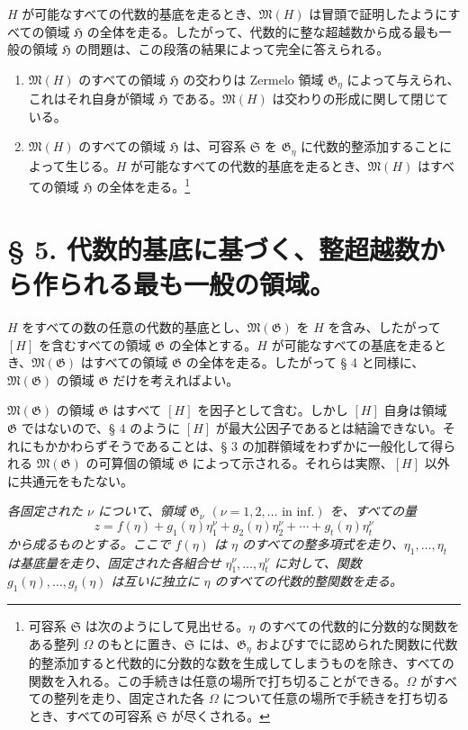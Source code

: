 \documentclass[11pt]{article}
\begin{document}
$H$ が可能なすべての代数的基底を走るとき、$\mathfrak M(H)$ は冒頭で証明したようにすべての領域 $\mathfrak H$ の全体を走る。したがって、代数的に整な超越数から成る最も一般の領域 $\mathfrak H$ の問題は、この段落の結果によって完全に答えられる。
\begin{enumerate}
\item[a)] $\mathfrak M(H)$ のすべての領域 $\mathfrak H$ の交わりは Zermelo 領域 $\mathfrak G_\eta$ によって与えられ、これはそれ自身が領域 $\mathfrak H$ である。$\mathfrak M(H)$ は交わりの形成に関して閉じている。
\item[b)] $\mathfrak M(H)$ のすべての領域 $\mathfrak H$ は、可容系 $\mathfrak S$ を $\mathfrak G_\eta$ に代数的整添加することによって生じる。$H$ が可能なすべての代数的基底を走るとき、$\mathfrak M(H)$ はすべての領域 $\mathfrak H$ の全体を走る。\footnote{可容系 $\mathfrak S$ は次のようにして見出せる。$\eta$ のすべての代数的に分数的な関数をある整列 $\Omega$ のもとに置き、$\mathfrak S$ には、$\mathfrak G_\eta$ およびすでに認められた関数に代数的整添加すると代数的に分数的な数を生成してしまうものを除き、すべての関数を入れる。この手続きは任意の場所で打ち切ることができる。$\Omega$ がすべての整列を走り、固定された各 $\Omega$ について任意の場所で手続きを打ち切るとき、すべての可容系 $\mathfrak S$ が尽くされる。}
\end{enumerate}

\section*{§ 5. 代数的基底に基づく、整超越数から作られる最も一般の領域。}

$H$ をすべての数の任意の代数的基底とし、$\mathfrak M(\mathfrak G)$ を $H$ を含み、したがって $[H]$ を含むすべての領域 $\mathfrak G$ の全体とする。$H$ が可能なすべての基底を走るとき、$\mathfrak M(\mathfrak G)$ はすべての領域 $\mathfrak G$ の全体を走る。したがって § 4 と同様に、$\mathfrak M(\mathfrak G)$ の領域 $\mathfrak G$ だけを考えればよい。

$\mathfrak M(\mathfrak G)$ の領域 $\mathfrak G$ はすべて $[H]$ を因子として含む。しかし $[H]$ 自身は領域 $\mathfrak G$ ではないので、§ 4 のように $[H]$ が最大公因子であるとは結論できない。それにもかかわらずそうであることは、§ 3 の加群領域をわずかに一般化して得られる $\mathfrak M(\mathfrak G)$ の可算個の領域 $\mathfrak G$ によって示される。それらは実際、$[H]$ 以外に共通元をもたない。

\emph{各固定された $\nu$ について、領域 $\mathfrak G_\nu$ $(\nu=1,2,\ldots\text{ in inf.})$ を、すべての量}
\begin{equation}
z=f(\eta)+g_1(\eta)\eta_1^\nu+g_2(\eta)\eta_2^\nu+\cdots+g_t(\eta)\eta_t^\nu
\tag{1}
\end{equation}
\emph{から成るものとする。ここで $f(\eta)$ は $\eta$ のすべての整多項式を走り、$\eta_1,\ldots,\eta_t$ は基底量を走り、固定された各組合せ $\eta_1^\nu,\ldots,\eta_t^\nu$ に対して、関数 $g_1(\eta),\ldots,g_t(\eta)$ は互いに独立に $\eta$ のすべての代数的整関数を走る。}
\end{document}
